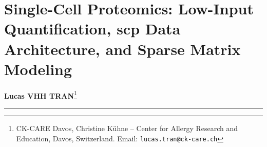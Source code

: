 \documentclass[11pt,twoside,openright]{book}
\begin{document}
\setcounter{chapter}{25}
\chapter{Single-Cell Proteomics: Low-Input Quantification, scp Data Architecture, and Sparse Matrix Modeling}
\label{ch:single_cell}

\noindent
\textbf{Lucas VHH TRAN}\footnote{CK-CARE Davos, Christine K\"uhne -- Center for Allergy Research and Education, Davos, Switzerland. Email: \texttt{lucas.tran@ck-care.ch}}\\
\rule{\textwidth}{0.8pt}

\begin{abstract}
\noindent
Bulk quantitative proteomics measures the ensemble average of millions of cells, masking stochastic transcriptional bursting, rare functional sub-populations, and cell-to-cell biochemical heterogeneity. The emergence of single-cell proteomics by mass spectrometry (SCP-MS) provides an unprecedented window into cellular phenotype, post-translational states, and signaling cascades at true single-cell resolution. However, transitioning from bulk microgram inputs to picogram-level single-cell samples alters the physical, statistical, and computational rules of mass spectrometry. Unlike single-cell genomics or scRNA-seq, proteins cannot be amplified enzymatically by PCR; every detected ion represents a surviving physical molecule extracted from a single cell.

Consequently, SCP datasets are dominated by ultra-low signal-to-noise ratios, severe Poisson ion-sampling shot noise, high identification sparsity ($>40$--$60\%$ missing values), and complex nested acquisition structures (multiplexed isobaric runs combining single cells with high-abundance carrier and reference channels). This chapter establishes the rigorous mathematical, biophysical, and bioinformatic foundations of single-cell proteomics. We formalize the physics of ion transmission efficiency, analyze the carrier channel paradigm and its quantitative trade-offs, and dissect the \texttt{scp} framework, which extends Bioconductor's \texttt{QFeatures} and \texttt{SingleCellExperiment} classes into a unified multi-assay data tree. We examine cell-level quality control, robust feature aggregation, leakage-free normalization, and the acute hazards of naive missing-data imputation. The chapter culminates in an executable, end-to-end R laboratory, the ``Five Deadly Sins'' of single-cell proteomics, a self-assessment diagnostic checklist, and multi-tier exercises with exhaustive step-by-step worked solutions.
\end{abstract}
\end{document}
